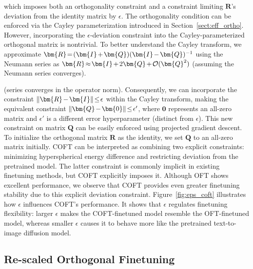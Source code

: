 which imposes both an orthogonality constraint and a constraint limiting $\bm{R}$’s deviation from the identity matrix by $\epsilon$. The orthogonality condition can be enforced via the Cayley parameterization introduced in Section~\ref{sect:eff_ortho}. However, incorporating the $\epsilon$-deviation constraint into the Cayley-parameterized orthogonal matrix is nontrivial. To better understand the Cayley transform, we approximate $\thickmuskip=2mu \medmuskip=2mu \bm{R}=(\bm{I}+\bm{Q})(\bm{I}-\bm{Q})^{-1}$ using the Neumann series as $\thickmuskip=2mu \medmuskip=2mu \bm{R}\approx\bm{I}+2\bm{Q}+\mathcal{O}(\bm{Q}^2)$ (assuming the Neumann series converges).

(series converges in the operator norm). Consequently, we can incorporate the constraint $\thickmuskip=2mu \medmuskip=2mu\|\bm{R}-\bm{I}\|\leq\epsilon$ within the Cayley transform, making the equivalent constraint $\thickmuskip=2mu \medmuskip=2mu \|\bm{Q}-\bm{0}\|\leq\epsilon'$, where $\bm{0}$ represents an all-zero matrix and $\epsilon'$ is a different error hyperparameter (distinct from $\epsilon$). This new constraint on matrix $\bm{Q}$ can be easily enforced using projected gradient descent. To initialize the orthogonal matrix $\bm{R}$ as the identity, we set $\bm{Q}$ to an all-zero matrix initially. COFT can be interpreted as combining two explicit constraints: minimizing hyperspherical energy difference and restricting deviation from the pretrained model. The latter constraint is commonly implicit in existing finetuning methods, but COFT explicitly imposes it. Although OFT shows excellent performance, we observe that COFT provides even greater finetuning stability due to this explicit deviation constraint. Figure~\ref{fig:eps_coft} illustrates how $\epsilon$ influences COFT's performance. It shows that $\epsilon$ regulates finetuning flexibility: larger $\epsilon$ makes the COFT-finetuned model resemble the OFT-finetuned model, whereas smaller $\epsilon$ causes it to behave more like the pretrained text-to-image diffusion model.

\subsection{Re-scaled Orthogonal Finetuning}

